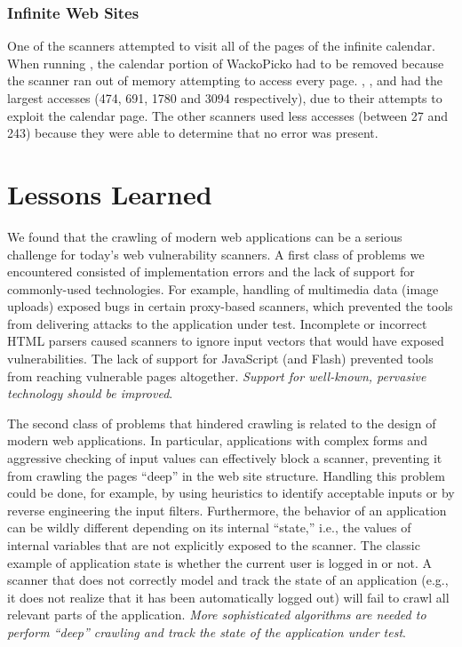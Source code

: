 \subsubsection{Infinite Web Sites}
One of the scanners attempted to visit all of the pages of the
infinite calendar. When running \grendelscan{}, the calendar portion of
WackoPicko had to be removed because the scanner ran out of
memory attempting to access every page. \acunetix{}, \burp{},
\nstalker{} and \waf{} had the largest accesses (474, 691, 1780 and 3094
respectively), due to their attempts to exploit the calendar page. The
other scanners used less accesses (between 27 and 243) because they were
able to determine that no error was present.

\section{Lessons Learned}

We found that the crawling of modern web applications can be a serious
challenge for today's web vulnerability scanners. 
A first class of problems we encountered consisted of
implementation errors and the lack of support for commonly-used technologies.
For example, handling of multimedia data (image uploads) exposed bugs in certain
proxy-based scanners, which prevented the tools from delivering attacks
to the application under test. Incomplete or incorrect HTML
parsers caused scanners to ignore input vectors that would have exposed
vulnerabilities. The lack of support for JavaScript (and Flash) prevented
tools from reaching vulnerable pages altogether.
{\em Support for well-known, pervasive technology should be improved}.

The second class of problems that hindered crawling is related to the
design of modern web applications. In particular, applications with
complex forms and aggressive checking of input values can effectively
block a scanner, preventing it from crawling the pages ``deep'' in the web
site structure. Handling this problem could be done, for example, by
using heuristics to identify acceptable inputs or by reverse engineering
the input filters. Furthermore, the behavior of an application can be
wildly different depending on its internal ``state,'' i.e., the values
of internal variables that are not explicitly exposed to the
scanner. The classic example of application state is whether the current
user is logged in or not. A scanner that does not correctly model and
track the state of an application (e.g., it does not realize that it has
been automatically logged out) will fail to crawl all relevant parts of
the application.
{\em More sophisticated algorithms are needed to perform ``deep''
crawling and track the state of the application under test}.

